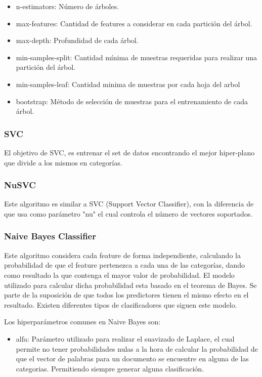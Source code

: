 \documentclass[12pt,a4paper]{article}
\begin{document}
\begin{itemize}
    \item n-estimators: Número de árboles.
    
    \item max-features: Cantidad de features a considerar en cada partición del árbol.
    
    \item max-depth: Profundidad de cada árbol.
    
    \item min-samples-split: Cantidad mínima de muestras requeridas para realizar una partición del árbol.
    
    \item min-samples-leaf: Cantidad minima de muestras por cada hoja del arbol
    
    \item bootstrap: Método de selección de muestras para el entrenamiento de cada árbol.
    
\end{itemize}

\subsubsection{SVC}
El objetivo de SVC, es entrenar el set de datos encontrando el mejor hiper-plano que divide a los mismos en categorías.

\subsubsection{NuSVC}
Este algoritmo es similar a SVC (Support Vector Classifier), con la diferencia de que usa como parámetro "nu" el cual controla el número de vectores soportados.

\subsubsection{Naive Bayes Classifier}
Este algoritmo considera cada feature de forma independiente, calculando la probabilidad de que el feature pertenezca a cada una de las categorías, dando como resultado la que contenga el mayor valor de probabilidad. El modelo utilizado para calcular dicha probabilidad esta basado en el teorema de Bayes. Se parte de la suposición de que todos los predictores tienen el mismo efecto en el resultado. Existen diferentes tipos de clasificadores que siguen este modelo.

Los hiperparámetros comunes en Naive Bayes son:
\begin{itemize}
    \item alfa: Parámetro utilizado para realizar el suavizado de Laplace, el cual permite no tener probabilidades nulas a la hora de calcular la probabilidad de que el vector de palabras para un documento se encuentre en alguna de las categorias. Permitiendo siempre generar alguna clasificación. 
\end{itemize}
\end{document}
